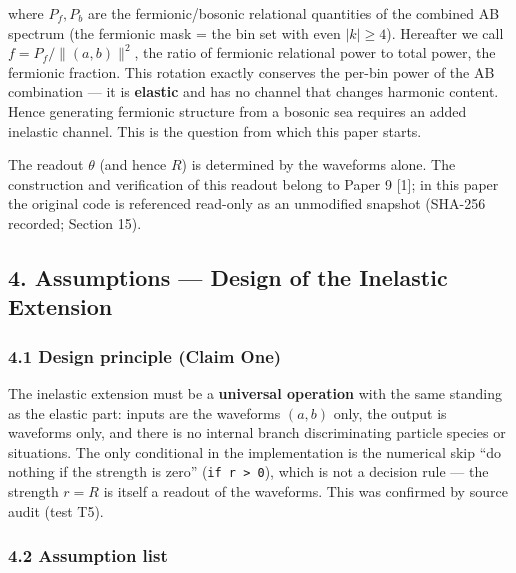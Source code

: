 \documentclass[
  a4paper,
]{article}
\begin{document}
where \(P_f, P_b\) are the fermionic/bosonic relational quantities of
the combined AB spectrum (the fermionic mask = the bin set with even
\(|k|\ge 4\)). Hereafter we call \(f = P_f/\lVert(a,b)\rVert^2\), the
ratio of fermionic relational power to total power, the fermionic
fraction. This rotation exactly conserves the per-bin power of the AB
combination --- it is \textbf{elastic} and has no channel that changes
harmonic content. Hence generating fermionic structure from a bosonic
sea requires an added inelastic channel. This is the question from which
this paper starts.

The readout \(\theta\) (and hence \(R\)) is determined by the waveforms
alone. The construction and verification of this readout belong to Paper
9 {[}1{]}; in this paper the original code is referenced read-only as an
unmodified snapshot (SHA-256 recorded; Section 15).

\subsection{4. Assumptions --- Design of the Inelastic
Extension}\label{assumptions-design-of-the-inelastic-extension}

\subsubsection{4.1 Design principle (Claim
One)}\label{design-principle-claim-one}

The inelastic extension must be a \textbf{universal operation} with the
same standing as the elastic part: inputs are the waveforms \((a,b)\)
only, the output is waveforms only, and there is no internal branch
discriminating particle species or situations. The only conditional in
the implementation is the numerical skip ``do nothing if the strength is
zero'' (\texttt{if\ r\ \textgreater{}\ 0}), which is not a decision rule
--- the strength \(r=R\) is itself a readout of the waveforms. This was
confirmed by source audit (test T5).

\subsubsection{4.2 Assumption list}\label{assumption-list}
\end{document}
